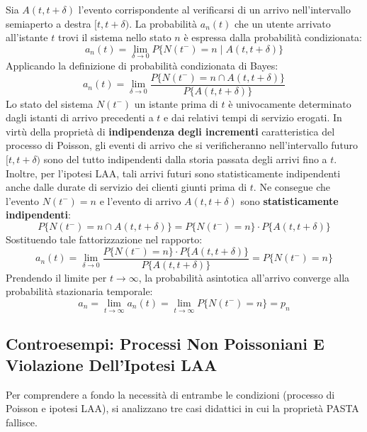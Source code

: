 \documentclass[11pt, a4paper]{article}
\begin{document}
Sia $A(t, t+\delta)$ l'evento corrispondente al verificarsi di un arrivo nell'intervallo semiaperto a destra $[t, t+\delta)$. La probabilità $a_n(t)$ che un utente arrivato all'istante $t$ trovi il sistema nello stato $n$ è espressa dalla probabilità condizionata:
\[
a_n(t) = \lim_{\delta \to 0} P\{N(t^-) = n \mid A(t, t+\delta)\}
\]
Applicando la definizione di probabilità condizionata di Bayes:
\[
a_n(t) = \lim_{\delta \to 0} \frac{P\{N(t^-) = n \cap A(t, t+\delta)\}}{P\{A(t, t+\delta)\}}
\]
Lo stato del sistema $N(t^-)$ un istante prima di $t$ è univocamente determinato dagli istanti di arrivo precedenti a $t$ e dai relativi tempi di servizio erogati. In virtù della proprietà di \textbf{indipendenza degli incrementi} caratteristica del processo di Poisson, gli eventi di arrivo che si verificheranno nell'intervallo futuro $[t, t+\delta)$ sono del tutto indipendenti dalla storia passata degli arrivi fino a $t$. Inoltre, per l'ipotesi LAA, tali arrivi futuri sono statisticamente indipendenti anche dalle durate di servizio dei clienti giunti prima di $t$. Ne consegue che l'evento $N(t^-) = n$ e l'evento di arrivo $A(t, t+\delta)$ sono \textbf{statisticamente indipendenti}:
\[
P\{N(t^-) = n \cap A(t, t+\delta)\} = P\{N(t^-) = n\} \cdot P\{A(t, t+\delta)\}
\]
Sostituendo tale fattorizzazione nel rapporto:
\[
a_n(t) = \lim_{\delta \to 0} \frac{P\{N(t^-) = n\} \cdot P\{A(t, t+\delta)\}}{P\{A(t, t+\delta)\}} = P\{N(t^-) = n\}
\]
Prendendo il limite per $t \to \infty$, la probabilità asintotica all'arrivo converge alla probabilità stazionaria temporale:
\[
a_n = \lim_{t \to \infty} a_n(t) = \lim_{t \to \infty} P\{N(t^-) = n\} = p_n
\]


\subsection{Controesempi: Processi Non Poissoniani E Violazione Dell'Ipotesi LAA}

Per comprendere a fondo la necessità di entrambe le condizioni (processo di Poisson e ipotesi LAA), si analizzano tre casi didattici in cui la proprietà PASTA fallisce.

\end{document}
